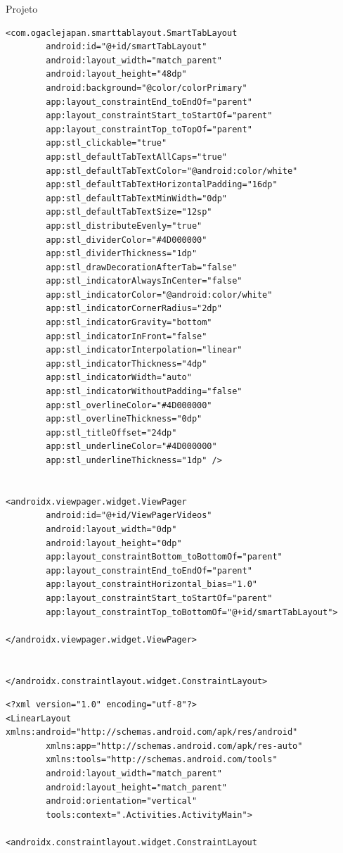 \documentclass[
	12pt,				%
	openright,			%
	twoside,			%
	a4paper,			%
	english,			%
	french,				%
	spanish,			%
	brazil				%
	]{abntex2}
\begin{document}
\begin{chapter}{Projeto}
\begin{lstlisting}[numbers=none,basicstyle=\small,
caption={ActivityVideos.xml},
title={ActivityVideos.xml},
label={ActivityVideos.xml}]
<com.ogaclejapan.smarttablayout.SmartTabLayout
		android:id="@+id/smartTabLayout"
		android:layout_width="match_parent"
		android:layout_height="48dp"
		android:background="@color/colorPrimary"
		app:layout_constraintEnd_toEndOf="parent"
		app:layout_constraintStart_toStartOf="parent"
		app:layout_constraintTop_toTopOf="parent"
		app:stl_clickable="true"
		app:stl_defaultTabTextAllCaps="true"
		app:stl_defaultTabTextColor="@android:color/white"
		app:stl_defaultTabTextHorizontalPadding="16dp"
		app:stl_defaultTabTextMinWidth="0dp"
		app:stl_defaultTabTextSize="12sp"
		app:stl_distributeEvenly="true"
		app:stl_dividerColor="#4D000000"
		app:stl_dividerThickness="1dp"
		app:stl_drawDecorationAfterTab="false"
		app:stl_indicatorAlwaysInCenter="false"
		app:stl_indicatorColor="@android:color/white"
		app:stl_indicatorCornerRadius="2dp"
		app:stl_indicatorGravity="bottom"
		app:stl_indicatorInFront="false"
		app:stl_indicatorInterpolation="linear"
		app:stl_indicatorThickness="4dp"
		app:stl_indicatorWidth="auto"
		app:stl_indicatorWithoutPadding="false"
		app:stl_overlineColor="#4D000000"
		app:stl_overlineThickness="0dp"
		app:stl_titleOffset="24dp"
		app:stl_underlineColor="#4D000000"
		app:stl_underlineThickness="1dp" />


<androidx.viewpager.widget.ViewPager
		android:id="@+id/ViewPagerVideos"
		android:layout_width="0dp"
		android:layout_height="0dp"
		app:layout_constraintBottom_toBottomOf="parent"
		app:layout_constraintEnd_toEndOf="parent"
		app:layout_constraintHorizontal_bias="1.0"
		app:layout_constraintStart_toStartOf="parent"
		app:layout_constraintTop_toBottomOf="@+id/smartTabLayout">

</androidx.viewpager.widget.ViewPager>


</androidx.constraintlayout.widget.ConstraintLayout>
\end{lstlisting}

\begin{lstlisting}[numbers=none,basicstyle=\small,
caption={FragmentVideos.xml},
title={FragmentVideos.xml},
label={FragmentVideos.xml}]<?xml version="1.0" encoding="utf-8"?>
<LinearLayout xmlns:android="http://schemas.android.com/apk/res/android"
		xmlns:app="http://schemas.android.com/apk/res-auto"
		xmlns:tools="http://schemas.android.com/tools"
		android:layout_width="match_parent"
		android:layout_height="match_parent"
		android:orientation="vertical"
		tools:context=".Activities.ActivityMain">

<androidx.constraintlayout.widget.ConstraintLayout


\end{lstlisting}
\end{chapter}
\end{document}

